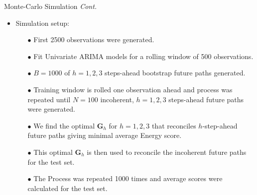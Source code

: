 \documentclass[11pt,xcolor=dvipsnames,table]{beamer} %
\begin{document}
\begin{frame}{Monte-Carlo Simulation \textit{Cont.}}
\begin{itemize}
	\item Simulation setup: 
	\begin{itemize}[<+-| alert@+>]
		\item [$\bullet$] First 2500 observations were generated.
		\item [$\bullet$] Fit Univariate ARIMA models for a rolling window of 500 observations.
		\item [$\bullet$] $B=1000$ of $h=1,2,3$ steps-ahead bootstrap future paths generated.
		\item [$\bullet$] Training window is rolled one observation ahead and process was repeated until $N=100$ incoherent, $h=1,2,3$ steps-ahead future paths were generated.
		\item [$\bullet$] We find the optimal $\bm{G}_h$ for $h=1,2,3$ that reconciles $h$-step-ahead future paths giving minimal average Energy score. 
		\item [$\bullet$] This optimal $\bm{G}_h$ is then used to reconcile the incoherent future paths for the test set.
		\item [$\bullet$] The Process was repeated 1000 times and average scores were calculated for the test set.
	\end{itemize}
\end{itemize}
\end{frame}
\end{document}
